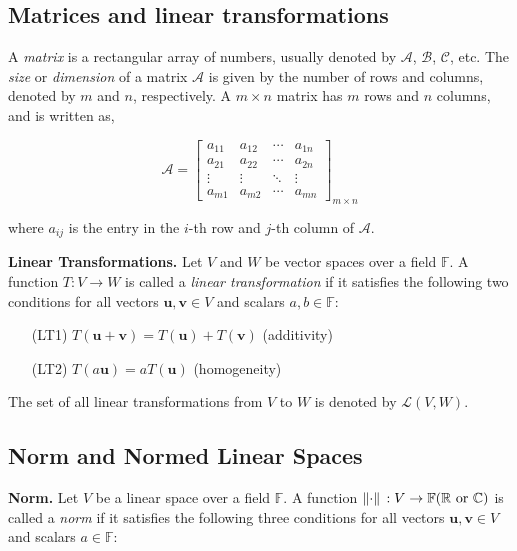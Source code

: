 \documentclass[12pt, a4paper]{article} %
\begin{document}
         \subsection{Matrices and linear transformations}

         A \textit{matrix} is a rectangular array of numbers, usually denoted by $\mathcal{A}$, $\mathcal{B}$, $\mathcal{C}$, etc. The \textit{size} or \textit{dimension} of a matrix $\mathcal{A}$ is given by the number of rows and columns, denoted by $m$ and $n$, respectively. A $m \times n$ matrix has $m$ rows and $n$ columns, and is written as,

         \[\mathcal{A} = \begin{bmatrix}
            a_{11} & a_{12} & \cdots & a_{1n} \\
            a_{21} & a_{22} & \cdots & a_{2n} \\
            \vdots & \vdots & \ddots & \vdots \\
            a_{m1} & a_{m2} & \cdots & a_{mn}

         \end{bmatrix}_{m\times n}\]

         \vspace*{0.5cm}

         where $a_{ij}$ is the entry in the $i$-th row and $j$-th column of $\mathcal{A}$.

         \textbf{Linear Transformations.} Let $V$ and $W$ be vector spaces over a field $\mathbb{F}$. A function $T:V\rightarrow W$ is called a \textit{linear transformation} if it satisfies the following two conditions for all vectors $\mathbf{u},\mathbf{v}\in V$ and scalars $a,b\in \mathbb{F}$:

\begin{itemize}
\item[(LT1)] $T(\mathbf{u}+\mathbf{v}) = T(\mathbf{u}) + T(\mathbf{v})$ (additivity)
\item[(LT2)] $T(a\mathbf{u}) = aT(\mathbf{u})$ (homogeneity)
\end{itemize}

The set of all linear transformations from $V$ to $W$ is denoted by $\mathcal{L}(V,W)$.

\subsection{Norm and Normed Linear Spaces}

\textbf{Norm.} Let $V$ be a linear space over a field $\mathbb{F}$. A function $\norm*{\cdot}:V\rightarrow \mathbb{F(\mathbb{R}\ \mbox{or}\ \mathbb{C} )}$ is called a \textit{norm} if it satisfies the following three conditions for all vectors $\mathbf{u},\mathbf{v}\in V$ and scalars $a\in \mathbb{F}$:
\end{document}
